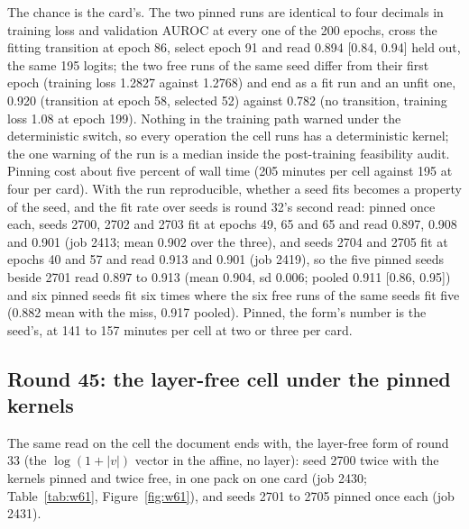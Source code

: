 The chance is the card's. The two pinned runs are identical to four decimals in
training loss and validation AUROC at every one of the 200 epochs, cross the fitting
transition at epoch 86, select epoch 91 and read 0.894 [0.84, 0.94] held out, the
same 195 logits; the two free runs of the same seed differ from their first epoch
(training loss 1.2827 against 1.2768) and end as a fit run and an unfit one, 0.920
(transition at epoch 58, selected 52) against 0.782 (no transition, training loss
1.08 at epoch 199). Nothing in the training path warned under the deterministic
switch, so every operation the cell runs has a deterministic kernel; the one warning
of the run is a median inside the post-training feasibility audit. Pinning cost
about five percent of wall time (205 minutes per cell against 195 at four per card).
With the run reproducible, whether a seed fits becomes a property of the seed, and
the fit rate over seeds is round 32's second read: pinned once each, seeds 2700, 2702
and 2703 fit at epochs 49, 65 and 65 and read 0.897, 0.908 and 0.901 (job 2413; mean
0.902 over the three), and seeds 2704 and 2705 fit at epochs 40 and 57 and read 0.913
and 0.901 (job 2419), so the five pinned seeds beside 2701 read 0.897 to 0.913 (mean
0.904, sd 0.006; pooled 0.911 [0.86, 0.95]) and six pinned seeds fit six times where
the six free runs of the same seeds fit five (0.882 mean with the miss, 0.917
pooled). Pinned, the form's number is the seed's, at 141 to 157 minutes per cell at
two or three per card.

\subsection{Round 45: the layer-free cell under the pinned kernels}
\label{sec:round45}

The same read on the cell the document ends with, the layer-free form of round 33
(the $\log(1 + |v|)$ vector in the affine, no layer): seed 2700 twice with the kernels
pinned and twice free, in one pack on one card (job 2430; Table~\ref{tab:w61},
Figure~\ref{fig:w61}), and seeds 2701 to 2705 pinned once each (job 2431).




